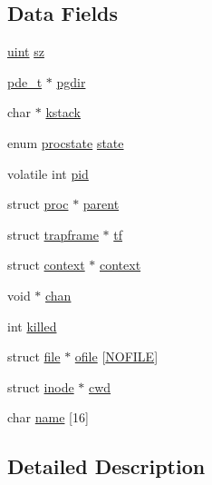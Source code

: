 \subsection*{Data Fields}
\begin{DoxyCompactItemize}
\item 
\hyperlink{types_8h_a91ad9478d81a7aaf2593e8d9c3d06a14}{uint} \hyperlink{structproc_aad1b9173bbedb8de751a61a0864dcb3b}{sz}
\item 
\hyperlink{types_8h_ac131849542282b2c95dfeaf1f26dc010}{pde\-\_\-t} $\ast$ \hyperlink{structproc_abff3d102541220b0e98884d1fe2a6379}{pgdir}
\item 
char $\ast$ \hyperlink{structproc_ac9e6d1f1429b69e5e860320d95a3c5aa}{kstack}
\item 
enum \hyperlink{proc_8h_aa1ced7d2b60040fded3fa873d0c03ba7}{procstate} \hyperlink{structproc_a59425505202fc7e53a519d95707cb26b}{state}
\item 
volatile int \hyperlink{structproc_a7b6cb9255530f2807765ad74872ebdc5}{pid}
\item 
struct \hyperlink{structproc}{proc} $\ast$ \hyperlink{structproc_ad3a4594e539894e96ae2f8fea321fef2}{parent}
\item 
struct \hyperlink{structtrapframe}{trapframe} $\ast$ \hyperlink{structproc_a5a8b7d6a32569e70bff92059bd93e602}{tf}
\item 
struct \hyperlink{structcontext}{context} $\ast$ \hyperlink{structproc_a30183e0aad45d3a56e1a22d3a8fecb17}{context}
\item 
void $\ast$ \hyperlink{structproc_ae26528bc7e93e1eb8573a30309dc1424}{chan}
\item 
int \hyperlink{structproc_ab41bdc92598ccb9a0a7c2f177aa3bd5d}{killed}
\item 
struct \hyperlink{structfile}{file} $\ast$ \hyperlink{structproc_a86c51eb2e4daa425944e034bfad64fb8}{ofile} \mbox{[}\hyperlink{param_8h_a80bacbaea8dd6aecf216d85d981bcb21}{N\-O\-F\-I\-L\-E}\mbox{]}
\item 
struct \hyperlink{structinode}{inode} $\ast$ \hyperlink{structproc_a9dfc3cbb1d3bc4f1b196c07092aa64ec}{cwd}
\item 
char \hyperlink{structproc_acd328517a6cf718155c2e6e22b671ca9}{name} \mbox{[}16\mbox{]}
\end{DoxyCompactItemize}


\subsection{Detailed Description}


